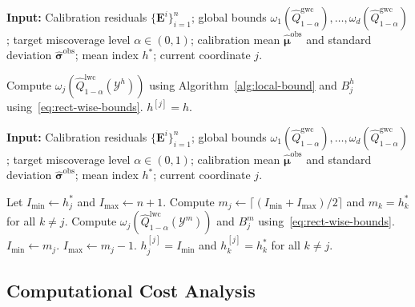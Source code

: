 \begin{algorithm}[!htbp]
\caption{Backward Search in Algorithm~\ref{alg:shortcut}}
\label{alg:backward}
\textbf{Input:} Calibration residuals $\{\mathbf{E}^i\}_{i=1}^{n}$; global bounds $\omega_1(\hat{Q}^{\mathrm{gwc}}_{1-\alpha}),\ldots,\omega_d(\hat{Q}^{\mathrm{gwc}}_{1-\alpha})$; target miscoverage level $\alpha\in(0,1)$; calibration mean $\hat{\boldsymbol\mu}^{\mathrm{obs}}$ and standard deviation $\hat{\boldsymbol\sigma}^{\mathrm{obs}}$; mean index $h^*$; current coordinate $j$.
\begin{algorithmic}[1]
        \State Compute $\omega_j(\hat{Q}^{\mathrm{lwc}}_{1-\alpha}(\mathcal{Y}^h))$ using Algorithm~\ref{alg:local-bound} and $B^{h}_j$ using~\eqref{eq:rect-wise-bounds}.
            \State \Return $h^{[j]} = h$.
        \EndIf
    \EndFor
\end{algorithmic}
\end{algorithm}

\begin{algorithm}[!htb]
\caption{Binary Search in Algorithm~\ref{alg:shortcut}}
\label{alg:binary}
\textbf{Input:} Calibration residuals $\{\mathbf{E}^i\}_{i=1}^{n}$; global bounds $\omega_1(\hat{Q}^{\mathrm{gwc}}_{1-\alpha}),\ldots,\omega_d(\hat{Q}^{\mathrm{gwc}}_{1-\alpha})$; target miscoverage level $\alpha\in(0,1)$; calibration mean $\hat{\boldsymbol\mu}^{\mathrm{obs}}$ and standard deviation $\hat{\boldsymbol\sigma}^{\mathrm{obs}}$; mean index $h^*$; current coordinate $j$.
\begin{algorithmic}[1]
    \State Let $I_{\min} \gets h^*_j$ and $I_{\max} \gets n+1$.
        \State Compute $m_j\gets \lceil (I_{\mathrm{min}}+I_\mathrm{max})/2\rceil$ and $m_k = h^*_k$ for all $k\neq j$.
        \State Compute $\omega_j(\hat{Q}^{\mathrm{lwc}}_{1-\alpha}(\mathcal{Y}^m))$ and $B^{m}_j$ using~\eqref{eq:rect-wise-bounds}.\hfill
            \State $I_{\mathrm{min}} \gets m_j$.
        \Else 
            \State $I_{\mathrm{max}} \gets m_j-1$.
        \EndIf
            \State \Return $h^{[j]}_j = I_{\min}$ and $h^{[j]}_k = h^*_k$ for all $k\neq j$.
        \EndIf
    \EndWhile
\end{algorithmic}
\end{algorithm}


\FloatBarrier

\subsection{Computational Cost Analysis}\label{app:alg-and-cost}

